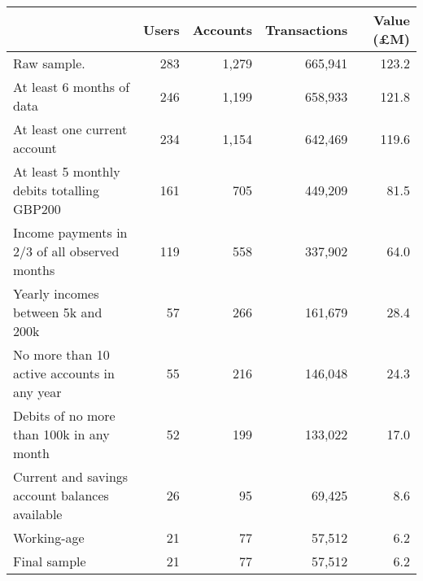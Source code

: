 \begin{tabular}{lrrrr}
\toprule
                                               & Users & Accounts & Transactions & Value (\pounds M) \\
\midrule
                                   Raw sample. &   283 &    1,279 &      665,941 &             123.2 \\
                     At least 6 months of data &   246 &    1,199 &      658,933 &             121.8 \\
                  At least one current account &   234 &    1,154 &      642,469 &             119.6 \\
    At least 5 monthly debits totalling GBP200 &   161 &      705 &      449,209 &              81.5 \\
 Income payments in 2/3 of all observed months &   119 &      558 &      337,902 &              64.0 \\
            Yearly incomes between 5k and 200k &    57 &      266 &      161,679 &              28.4 \\
   No more than 10 active accounts in any year &    55 &      216 &      146,048 &              24.3 \\
      Debits of no more than 100k in any month &    52 &      199 &      133,022 &              17.0 \\
Current and savings account balances available &    26 &       95 &       69,425 &               8.6 \\
                                   Working-age &    21 &       77 &       57,512 &               6.2 \\
                                  Final sample &    21 &       77 &       57,512 &               6.2 \\
\bottomrule
\end{tabular}
